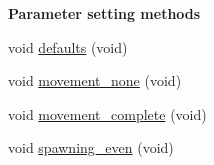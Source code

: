 \begin{Indent}{\bf Parameter setting methods}\par
\begin{DoxyCompactItemize}
\item 
void \hyperlink{classIOSKJ_1_1Model_a2018db7a3e7780fddc161f026dd35c4e}{defaults} (void)
\item 
void \hyperlink{classIOSKJ_1_1Model_ac65da2c311c6b0a840755af4d3ec17ea}{movement\-\_\-none} (void)
\item 
void \hyperlink{classIOSKJ_1_1Model_ac61f07fcabb36b29506d253d269985cf}{movement\-\_\-complete} (void)
\item 
void \hyperlink{classIOSKJ_1_1Model_aa825779594f07b2a0b28ffdd91feca27}{spawning\-\_\-even} (void)
\end{DoxyCompactItemize}
\end{Indent}
